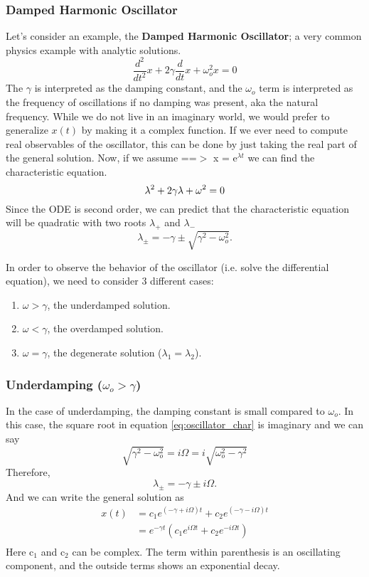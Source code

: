 \documentclass{article}
\newcommand{\be}{\begin{equation}}
\newcommand{\ee}{\end{equation}}
\newcommand{\benum}{\begin{enumerate}}
\newcommand{\eenum}{\end{enumerate}}
\begin{document}
\subsubsection*{Damped Harmonic Oscillator}
Let's consider an example, the \textbf{Damped Harmonic Oscillator}; a very common physics example with analytic solutions.
\be
\frac{d^2}{dt^2} x + 2\gamma \frac{d}{dt} x + \omega_o^2 x = 0
\ee
The $\gamma$ is interpreted as the damping constant, and the $\omega_o$ term is interpreted as the frequency of oscillations if no damping was present, aka the natural frequency.
While we do not live in an imaginary world, we would prefer to generalize $x(t)$ by making it a complex function.
If we ever need to compute real observables of the oscillator, this can be done by just taking the real part of the general solution.
Now, if we assume ==$>$ x = e$^{\lambda t}$ we can find the characteristic equation.
\be
\lambda^2 + 2\gamma\lambda  + \omega^2 = 0\\
\ee
Since the ODE is second order, we can predict that the characteristic equation will be quadratic with two roots $\lambda_+$ and $\lambda_-$
\be \label{eq:oscillator_char}
\lambda_{\pm} = -\gamma \pm \sqrt{\gamma^2 - \omega_o^2} .
\ee

In order to observe the behavior of the oscillator (i.e. solve the differential equation), we need to consider 3 different cases:
\benum
\item $\omega > \gamma$, the underdamped solution.
\item $\omega < \gamma$, the overdamped solution.
\item $\omega = \gamma$, the degenerate solution ($\lambda_1 = \lambda_2$).
\eenum

\subsubsection*{Underdamping ($\omega_o > \gamma$)}
In the case of underdamping, the damping constant is small compared to $\omega_o$. In this case, the square root in equation \ref{eq:oscillator_char} is imaginary and we can say
\be
\sqrt{\gamma^2 - \omega_o^2} = i \Omega = i \sqrt{\omega_o^2 - \gamma^2}
\ee
Therefore,
\be
\lambda_{\pm} = -\gamma \pm i \Omega .
\ee
And we can write the general solution as
\be
\begin{split}
x(t) &= c_1 e^{(-\gamma + i \Omega)t} + c_2 e^{(-\gamma - i \Omega)t} \\
&= e^{-\gamma t}(c_1 e^{i \Omega t} + c_2 e^{-i \Omega t}) \\
\end{split}
\ee
Here c$_1$ and c$_2$ can be complex.
The term within parenthesis is an oscillating component, and the outside terms shows an exponential decay.
\end{document}
